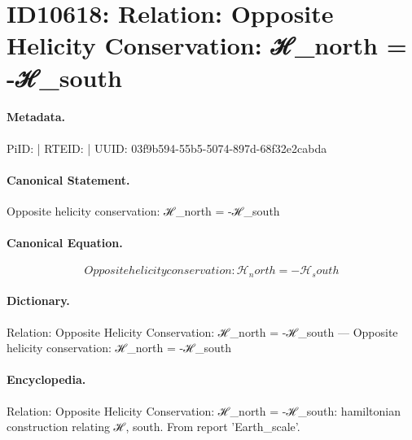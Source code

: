 \section*{ID10618: Relation: Opposite Helicity Conservation: ℋ\_north = -ℋ\_south}
\paragraph{Metadata.}
PiID:  | RTEID:  | UUID: 03f9b594-55b5-5074-897d-68f32e2cabda

\paragraph{Canonical Statement.}
Opposite helicity conservation: ℋ\_north = -ℋ\_south

\paragraph{Canonical Equation.}
\[
Opposite helicity conservation: ℋ_north = -ℋ_south
\]

\paragraph{Dictionary.}
Relation: Opposite Helicity Conservation: ℋ\_north = -ℋ\_south — Opposite helicity conservation: ℋ\_north = -ℋ\_south

\paragraph{Encyclopedia.}
Relation: Opposite Helicity Conservation: ℋ\_north = -ℋ\_south: hamiltonian construction relating ℋ, south. From report 'Earth\_scale'.
